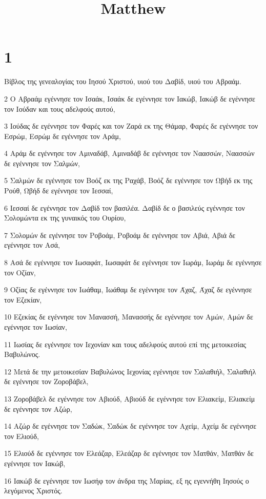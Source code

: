

\title{Matthew}


\chapter{1}

\par Βίβλος της γενεαλογίας του Ιησού Χριστού, υιού του Δαβίδ, υιού του Αβραάμ.
\par 2 Ο Αβραάμ εγέννησε τον Ισαάκ, Ισαάκ δε εγέννησε τον Ιακώβ, Ιακώβ δε εγέννησε τον Ιούδαν και τους αδελφούς αυτού,
\par 3 Ιούδας δε εγέννησε τον Φαρές και τον Ζαρά εκ της Θάμαρ, Φαρές δε εγέννησε τον Εσρώμ, Εσρώμ δε εγέννησε τον Αράμ,
\par 4 Αράμ δε εγέννησε τον Αμιναδάβ, Αμιναδάβ δε εγέννησε τον Ναασσών, Ναασσών δε εγέννησε τον Σαλμών,
\par 5 Σαλμών δε εγέννησε τον Βοόζ εκ της Ραχάβ, Βοόζ δε εγέννησε τον Ωβήδ εκ της Ρούθ, Ωβήδ δε εγέννησε τον Ιεσσαί,
\par 6 Ιεσσαί δε εγέννησε τον Δαβίδ τον βασιλέα. Δαβίδ δε ο βασιλεύς εγέννησε τον Σολομώντα εκ της γυναικός του Ουρίου,
\par 7 Σολομών δε εγέννησε τον Ροβοάμ, Ροβοάμ δε εγέννησε τον Αβιά, Αβιά δε εγέννησε τον Ασά,
\par 8 Ασά δε εγέννησε τον Ιωσαφάτ, Ιωσαφάτ δε εγέννησε τον Ιωράμ, Ιωράμ δε εγέννησε τον Οζίαν,
\par 9 Οζίας δε εγέννησε τον Ιωάθαμ, Ιωάθαμ δε εγέννησε τον Άχαζ, Άχαζ δε εγέννησε τον Εζεκίαν,
\par 10 Εζεκίας δε εγέννησε τον Μανασσή, Μανασσής δε εγέννησε τον Αμών, Αμών δε εγέννησε τον Ιωσίαν,
\par 11 Ιωσίας δε εγέννησε τον Ιεχονίαν και τους αδελφούς αυτού επί της μετοικεσίας Βαβυλώνος.
\par 12 Μετά δε την μετοικεσίαν Βαβυλώνος Ιεχονίας εγέννησε τον Σαλαθιήλ, Σαλαθιήλ δε εγέννησε τον Ζοροβάβελ,
\par 13 Ζοροβάβελ δε εγέννησε τον Αβιούδ, Αβιούδ δε εγέννησε τον Ελιακείμ, Ελιακείμ δε εγέννησε τον Αζώρ,
\par 14 Αζώρ δε εγέννησε τον Σαδώκ, Σαδώκ δε εγέννησε τον Αχείμ, Αχείμ δε εγέννησε τον Ελιούδ,
\par 15 Ελιούδ δε εγέννησε τον Ελεάζαρ, Ελεάζαρ δε εγέννησε τον Ματθάν, Ματθάν δε εγέννησε τον Ιακώβ,
\par 16 Ιακώβ δε εγέννησε τον Ιωσήφ τον άνδρα της Μαρίας, εξ ης εγεννήθη Ιησούς ο λεγόμενος Χριστός.
